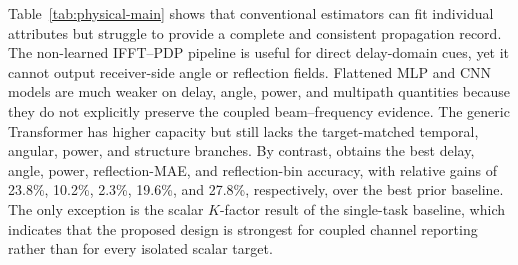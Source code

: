 \begin{table}[!t]
\vspace{2pt}
\end{table}

Table~\ref{tab:physical-main} shows that conventional estimators can fit individual attributes but
struggle to provide a complete and consistent propagation record. The non-learned IFFT--PDP pipeline
is useful for direct delay-domain cues, yet it cannot output receiver-side angle or reflection fields.
Flattened MLP and CNN models are much weaker on delay, angle, power, and multipath quantities because
they do not explicitly preserve the coupled beam--frequency evidence. The generic Transformer has
higher capacity but still lacks the target-matched temporal, angular, power, and structure branches.
By contrast, \model{} obtains the best delay, angle, power, reflection-MAE, and reflection-bin
accuracy, with relative gains of 23.8\%, 10.2\%, 2.3\%, 19.6\%, and 27.8\%, respectively, over the
best prior baseline. The only exception is the scalar $K$-factor result of the single-task baseline,
which indicates that the proposed design is strongest for coupled channel reporting rather than for
every isolated scalar target.


